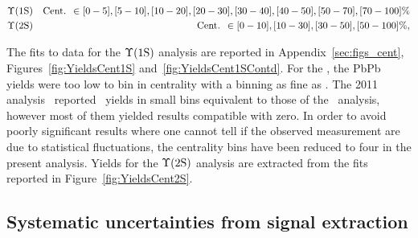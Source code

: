 \begin{eqnarray}
  &\Upsilon\mathrm{(1S)}&\textrm{Cent. }\in [0-5], [5-10], [10-20], [20-30],
  [30-40], [40-50], [50-70], [70-100] \% \nonumber  \\
  &\Upsilon\mathrm{(2S)}&\textrm{Cent. }\in [0-10], [10-30], [30-50], [50-100] \% \nonumber ,
\end{eqnarray}

The fits to data for the $\Upsilon\mathrm{(1S)}$ analysis are reported
in Appendix~\ref{sec:figs_cent}, Figures~\ref{fig:YieldsCent1S} and~\ref{fig:YieldsCent1SContd}. For
the \PgUb, the PbPb yields were too low to bin in centrality with a
binning as fine as \PgUa. The 2011 analysis~\cite{11-011} reported
\PgUb\ yields in small bins equivalent to those of the \PgUa\
analysis, however most of them yielded results compatible with
zero. In order to avoid poorly significant results where one cannot
tell if the observed measurement are due to statistical fluctuations, the centrality
bins have been reduced to four in the present analysis. Yields for the $\Upsilon\mathrm{(2S)}$ analysis are
extracted from the fits reported in Figure~\ref{fig:YieldsCent2S}.


\subsection{Systematic uncertainties from signal extraction}
\label{sec:sigext_vars}


